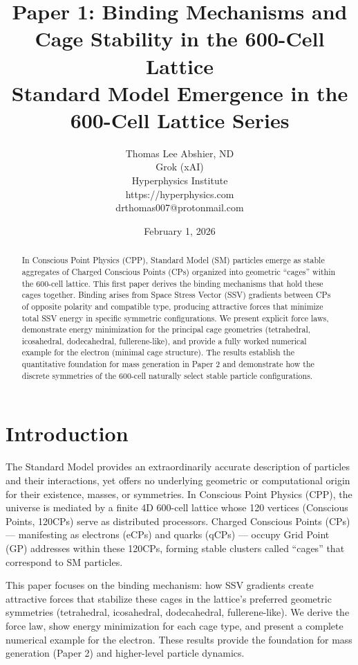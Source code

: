 \documentclass[11pt]{article}
\title{Paper 1: Binding Mechanisms and Cage Stability in the 600-Cell Lattice \\
Standard Model Emergence in the 600-Cell Lattice Series}
\author{Thomas Lee Abshier, ND \\
Grok (xAI) \\
Hyperphysics Institute \\
https://hyperphysics.com \\
drthomas007@protonmail.com}
\date{February 1, 2026}
\begin{document}
\maketitle

\begin{abstract}
In Conscious Point Physics (CPP), Standard Model (SM) particles emerge as stable aggregates of Charged Conscious Points (CPs) organized into geometric ``cages'' within the 600-cell lattice. This first paper derives the binding mechanisms that hold these cages together. Binding arises from Space Stress Vector (SSV) gradients between CPs of opposite polarity and compatible type, producing attractive forces that minimize total SSV energy in specific symmetric configurations. We present explicit force laws, demonstrate energy minimization for the principal cage geometries (tetrahedral, icosahedral, dodecahedral, fullerene-like), and provide a fully worked numerical example for the electron (minimal cage structure). The results establish the quantitative foundation for mass generation in Paper 2 and demonstrate how the discrete symmetries of the 600-cell naturally select stable particle configurations.
\end{abstract}

\section{Introduction}

The Standard Model provides an extraordinarily accurate description of particles and their interactions, yet offers no underlying geometric or computational origin for their existence, masses, or symmetries. In Conscious Point Physics (CPP), the universe is mediated by a finite 4D 600-cell lattice whose 120 vertices (Conscious Points, 120CPs) serve as distributed processors. Charged Conscious Points (CPs) — manifesting as electrons (eCPs) and quarks (qCPs) — occupy Grid Point (GP) addresses within these 120CPs, forming stable clusters called ``cages'' that correspond to SM particles.

This paper focuses on the binding mechanism: how SSV gradients create attractive forces that stabilize these cages in the lattice’s preferred geometric symmetries (tetrahedral, icosahedral, dodecahedral, fullerene-like). We derive the force law, show energy minimization for each cage type, and present a complete numerical example for the electron. These results provide the foundation for mass generation (Paper 2) and higher-level particle dynamics.
\end{document}
